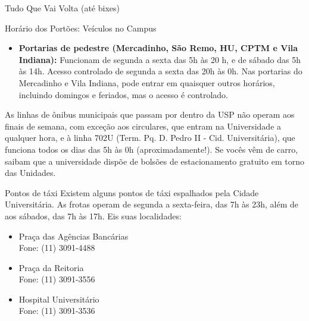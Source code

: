 \begin{secao}{Tudo Que Vai Volta (até bixes)}
\begin{subsecao}{Horário dos Portões: Veículos no Campus}
\begin{itemize}
  \item {\bf Portarias de pedestre (Mercadinho, São Remo, HU, CPTM e
      Vila Indiana):} Funcionam de segunda a sexta das 5h às 20 h, e de sábado das 5h às 14h.
      Acesso controlado de segunda a sexta das 20h às 0h. Nas portarias do Mercadinho e Vila
      Indiana, pode entrar em quaisquer outros horários, incluindo domingos e feriados, mas o
      acesso é controlado.

\end{itemize}

As linhas de ônibus municipais que passam por dentro da USP não operam aos finais de semana,
com exceção aos circulares, que entram na Universidade a qualquer hora, e à linha 702U (Term.
Pq. D. Pedro II - Cid. Universitária), que funciona todos os dias das 5h às 0h
(aproximadamente!). Se vocês vêm de carro, saibam que a universidade dispõe de bolsões de
estacionamento gratuito em torno das Unidades.

\end{subsecao}
\pagebreak
\begin{subsecao}{Pontos de táxi}
Existem alguns pontos de táxi espalhados pela Cidade Universitária. As frotas
operam de segunda a sexta-feira, das 7h às 23h, além de aos sábados, das 7h às 17h.
Eis suas localidades:

\begin{itemize}
\item Praça das Agências Bancárias\\
Fone: (11) 3091-4488

\item Praça da Reitoria\\
Fone: (11) 3091-3556

\item Hospital Universitário\\
Fone: (11) 3091-3536
\end{itemize}
\end{subsecao}

\end{secao}
